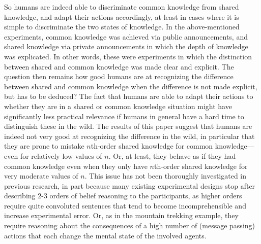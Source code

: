 \documentclass[twocolumn,a4paper,superscriptaddress,nofootinbib]{revtex4}
\begin{document}
So humans are indeed able to discriminate common knowledge from shared knowledge, and adapt their actions accordingly, at least in cases where it is simple to discriminate the two states of knowledge. In the above-mentioned experiments, common knowledge was achieved via public announcements, and shared knowledge via private announcements in which the depth of knowledge was explicated. In other words, these were experiments in which the distinction between shared and common knowledge was made clear and explicit. The question then remains how good humans are at recognizing the difference between shared and common knowledge when the difference is not made explicit, but has to be deduced? The fact that humans are able to adapt their actions to whether they are in a shared or common knowledge situation might have significantly less practical relevance if humans in general have a hard time to distinguish these in the wild. The results of this paper suggest that humans are indeed not very good at recognizing the difference in the wild, in particular that they are prone to mistake $n$th-order shared knowledge for common knowledge---even for relatively low values of $n$. Or, at least, they behave as if they had common knowledge even when they only have $n$th-order shared knowledge for very moderate values of $n$. This issue has not been thoroughly investigated in previous research, in part because many existing experimental designs stop after describing 2-3 orders of belief reasoning to the participants, as higher orders require quite convoluted sentences that tend to become incomprehensible and increase experimental error. Or, as in the mountain trekking example, they require reasoning about the consequences of a high number of (message passing) actions that each change the mental state of the involved agents.
\end{document}
